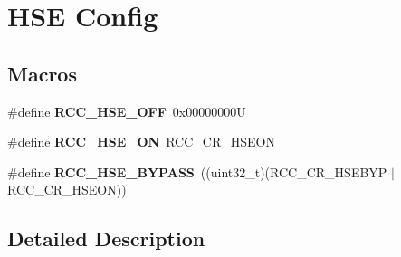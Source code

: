 \hypertarget{group___r_c_c___h_s_e___config}{}\section{H\+SE Config}
\label{group___r_c_c___h_s_e___config}
\subsection*{Macros}
\begin{DoxyCompactItemize}
\item 
\mbox{\label{group___r_c_c___h_s_e___config_ga1616626d23fbce440398578855df6f97}} 
\#define {\bfseries R\+C\+C\+\_\+\+H\+S\+E\+\_\+\+O\+FF}~0x00000000U
\item 
\mbox{\label{group___r_c_c___h_s_e___config_gabc4f70a44776c557af20496b04d9a9db}} 
\#define {\bfseries R\+C\+C\+\_\+\+H\+S\+E\+\_\+\+ON}~R\+C\+C\+\_\+\+C\+R\+\_\+\+H\+S\+E\+ON
\item 
\mbox{\label{group___r_c_c___h_s_e___config_ga5ca515db2d5c4d5bdb9ee3d154df2704}} 
\#define {\bfseries R\+C\+C\+\_\+\+H\+S\+E\+\_\+\+B\+Y\+P\+A\+SS}~((uint32\+\_\+t)(R\+C\+C\+\_\+\+C\+R\+\_\+\+H\+S\+E\+B\+YP $\vert$ R\+C\+C\+\_\+\+C\+R\+\_\+\+H\+S\+E\+ON))
\end{DoxyCompactItemize}


\subsection{Detailed Description}
